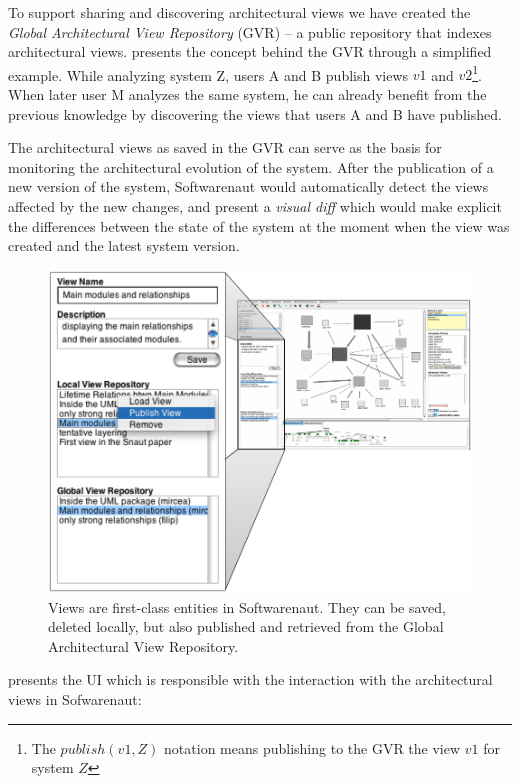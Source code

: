 \documentclass[preprint,12pt]{elsarticle}
\begin{document}
To support sharing and discovering architectural views we have created the {\em Global Architectural View Repository} (GVR) -- a public repository that indexes architectural views.  presents the concept behind the GVR through a simplified example. While analyzing system Z, users A and B publish views $v1$ and $v2$\footnote{The $publish(v1,Z)$ notation means publishing to the GVR the view $v1$ for system $Z$}. When later user M analyzes the same system, he can already benefit from the previous knowledge by discovering the views that users A and B have published. 


The architectural views as saved in the GVR can serve as the basis for monitoring the architectural evolution of the system. After the publication of a new version of the system, Softwarenaut would automatically detect the views affected by the new changes, and present a {\em visual diff} which would make explicit the differences between the state of the system at the moment when the view was created and the latest system version.

\begin{figure}[ht]
\begin{center}
\includegraphics[width=0.75\linewidth]{ViewOperations}
\caption{Views are first-class entities in Softwarenaut. They can be saved, deleted locally, but also published and retrieved from the Global Architectural View Repository.}
\end{center}
\end{figure}

 presents the UI which is responsible with the interaction with the architectural views in Sofwarenaut: 
\end{document}
